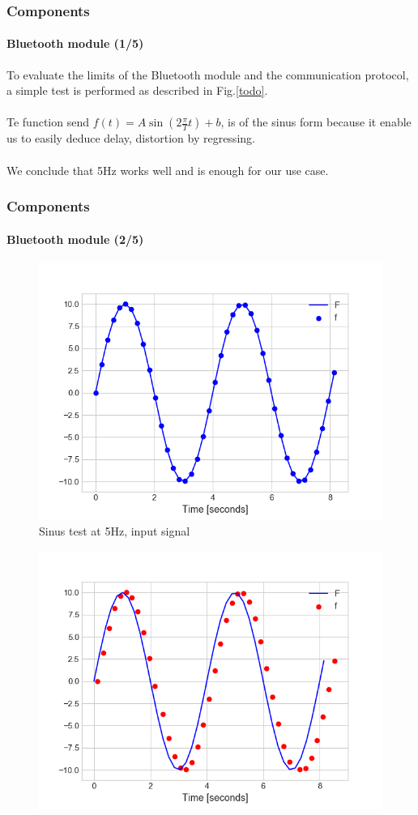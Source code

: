 \documentclass[10pt]{beamer}
\begin{document}
\begin{frame}
\frametitle{Components}
\framesubtitle{Bluetooth module (1/5)}
To evaluate the limits of the Bluetooth module and the communication protocol, a simple test is performed as described in Fig.\ref{todo}.\\~\\
Te function send $f(t) = A\sin(2\frac{\pi}{T}t)+b$, is of the sinus form because it enable us to easily deduce delay, distortion by regressing. \\~\\
We conclude that 5Hz works well and is enough for our use case.
\end{frame}


\begin{frame}
\frametitle{Components}
\framesubtitle{Bluetooth module (2/5)}
\begin{multicols}{2}
\begin{figure}
\centering
\includegraphics[scale=0.4]{figures/sending-5hz.png}
\caption{Sinus test at 5Hz, input signal}
\end{figure}
\columnbreak
\begin{figure}
\centering
\includegraphics[scale=0.4]{figures/reception-5hz.png}

\end{figure}
\end{multicols}
\end{frame}
\end{document}
